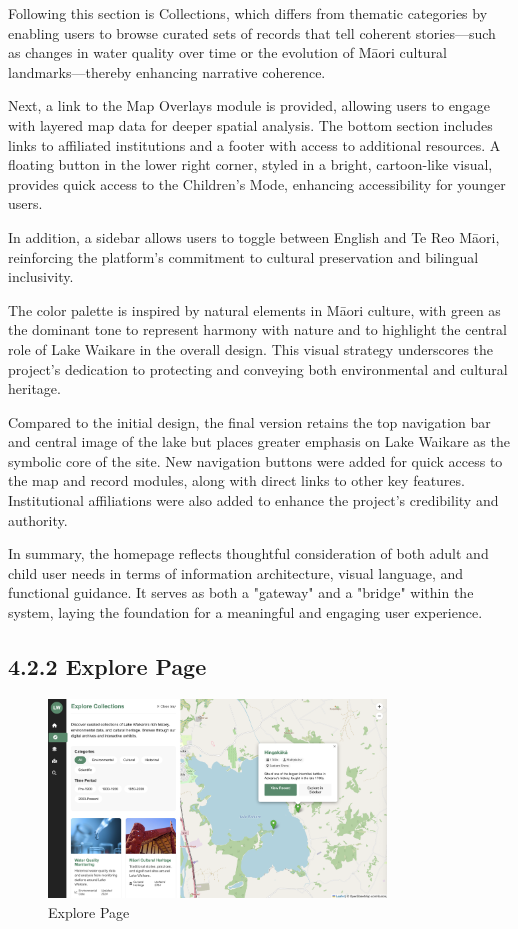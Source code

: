 Following this section is Collections, which differs from thematic categories by enabling users to browse curated sets of records that tell coherent stories—such as changes in water quality over time or the evolution of Māori cultural landmarks—thereby enhancing narrative coherence.

Next, a link to the Map Overlays module is provided, allowing users to engage with layered map data for deeper spatial analysis. The bottom section includes links to affiliated institutions and a footer with access to additional resources. A floating button in the lower right corner, styled in a bright, cartoon-like visual, provides quick access to the Children's Mode, enhancing accessibility for younger users.

In addition, a sidebar allows users to toggle between English and Te Reo Māori, reinforcing the platform's commitment to cultural preservation and bilingual inclusivity.

The color palette is inspired by natural elements in Māori culture, with green as the dominant tone to represent harmony with nature and to highlight the central role of Lake Waikare in the overall design. This visual strategy underscores the project's dedication to protecting and conveying both environmental and cultural heritage.

Compared to the initial design, the final version retains the top navigation bar and central image of the lake but places greater emphasis on Lake Waikare as the symbolic core of the site. New navigation buttons were added for quick access to the map and record modules, along with direct links to other key features. Institutional affiliations were also added to enhance the project's credibility and authority.

In summary, the homepage reflects thoughtful consideration of both adult and child user needs in terms of information architecture, visual language, and functional guidance. It serves as both a "gateway" and a "bridge" within the system, laying the foundation for a meaningful and engaging user experience.

\subsection*{4.2.2 Explore Page}
\begin{figure}[H]
    \centering
    \includegraphics[width=0.8\textwidth]{screenshot/prototype_explore.png}
    \caption{Explore Page}
    \label{fig:architecture}
\end{figure}

